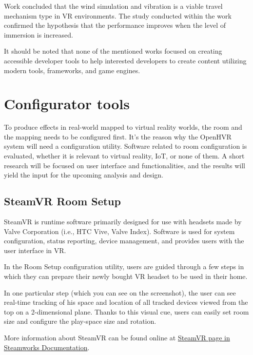 Work concluded that the wind simulation and vibration is a viable travel
mechanism type in VR environments. The study conducted within
the work confirmed the hypothesis that the performance improves when the level of
immersion is increased.

\vspace{2em}

It should be noted that none of the mentioned works focused on
creating accessible developer tools to help interested developers to create
content utilizing modern tools, frameworks, and game engines.


\hypertarget{x-configurator-tools}{\section{Configurator tools}}
To produce effects in real-world mapped to virtual reality worlds,
the room and the mapping needs to be configured first.
It’s the reason why the OpenHVR system will need a configuration utility.
Software related to room configuration is evaluated, whether it is relevant
to virtual reality, IoT, or none of them. A short research will be focused on 
user interface and functionalities, and the results will yield 
the input for the upcoming analysis and design.


\hypertarget{x-steamvr-room-setup}{\subsection{SteamVR Room Setup}}
SteamVR is runtime software primarily designed for use with headsets made
by Valve Corporation (i.e., HTC Vive, Valve Index). Software is used for
system configuration, status reporting, device management, and provides users
with the user interface in VR.\,\cite{steamvr}

In the Room Setup configuration utility, users are guided through a few steps
in which they can prepare their newly bought VR headset to be used in their
home.

In one particular step (which you can see on the screenshot), the user can see
real-time tracking of his space and location of all tracked devices viewed
from the top on a 2-dimensional plane. Thanks to this visual cue, users can
easily set room size and configure the play-space size and rotation.

More information about SteamVR can be found online at
\href{https://partner.steamgames.com/doc/features/steamvr/info}{SteamVR page in Steamworks Documentation}.

